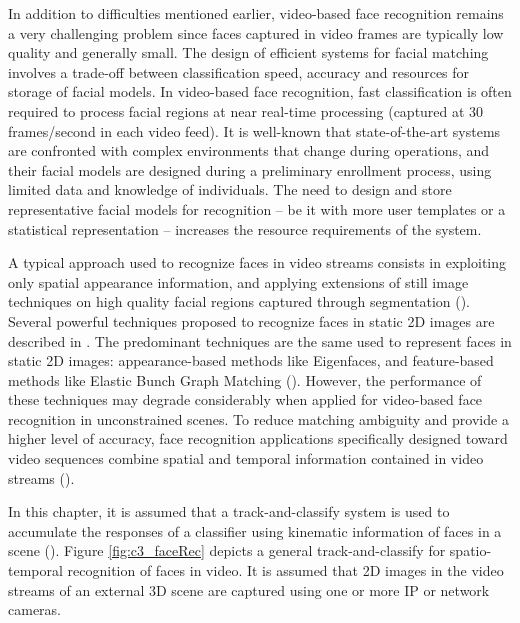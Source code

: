 In addition to difficulties mentioned earlier, video-based face recognition remains a very challenging problem since faces captured in video frames are typically low quality and generally small.
The design of efficient systems for facial matching involves a trade-off between classification speed, accuracy and resources for storage of facial models.
In video-based face recognition, fast classification is often required to process facial regions at near real-time processing (captured at 30 frames/second in each video feed).
It is well-known that state-of-the-art systems are confronted with complex environments that change during operations, and their facial models are designed during a preliminary enrollment process, using limited data and knowledge of individuals.
The need to design and store representative facial models for recognition -- be it with more user templates or a statistical representation -- increases the resource requirements of the system.

A typical approach used to recognize faces in video streams consists in exploiting only spatial appearance information, and applying extensions of still image techniques on high quality facial regions captured through segmentation (\cite{matta09}).
Several powerful techniques proposed to recognize faces in static 2D images are described in \cite{zhang09,zhao03}.
The predominant techniques are the same used to represent faces in static 2D images: appearance-based methods like Eigenfaces, and feature-based methods like Elastic Bunch Graph Matching (\cite{zhang09,zhao03}).
However, the performance of these techniques may degrade considerably when applied for video-based face recognition in unconstrained scenes.
To reduce matching ambiguity and provide a higher level of accuracy, face recognition applications specifically designed toward video sequences combine spatial and temporal information contained in video streams (\cite{edwards99}).

In this chapter, it is assumed that a track-and-classify system is used to accumulate the responses of a classifier using kinematic information of faces in a scene (\cite{matta09}).
Figure \ref{fig:c3_faceRec} depicts a general track-and-classify for spatio-temporal recognition of faces in video.
It is assumed that 2D images in the video streams of an external 3D scene are captured using one or more IP or network cameras.

\begin{figure*}[t] \centering
  \caption{A generic track-and-classify biometric system for video-based face recognition}
	\label{fig:c3_faceRec}
\end{figure*}

